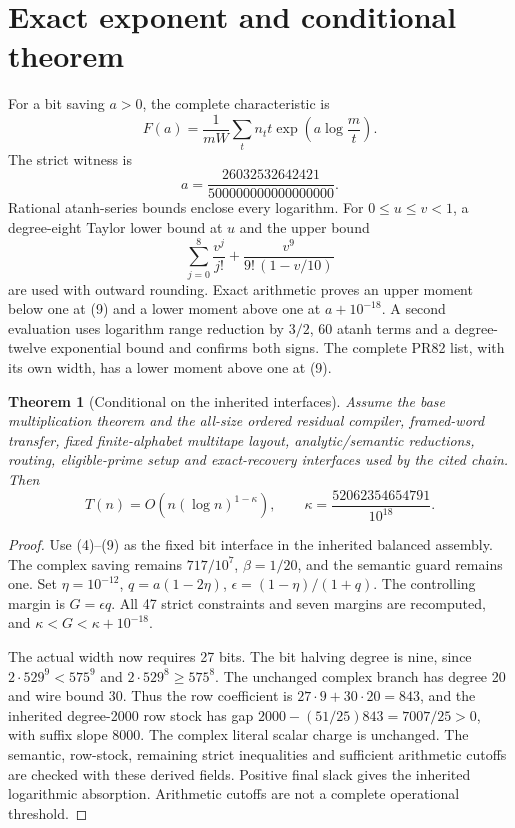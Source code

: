 \documentclass[11pt]{article}
\newtheorem{theorem}{Theorem}
\begin{document}
\section{Exact exponent and conditional theorem}
For a bit saving \(a>0\), the complete characteristic is
\[
 F(a)=\frac1{mW}\sum_t n_t t\exp\!\left(a\log\frac mt\right).
                                                                  \tag{8}
\]
The strict witness is
\[
 a=\frac{26032532642421}{500000000000000000}.                       \tag{9}
\]
Rational atanh-series bounds enclose every logarithm. For
\(0\le u\le v<1\), a degree-eight Taylor lower bound at \(u\) and the
upper bound
\[
 \sum_{j=0}^{8}\frac{v^j}{j!}+\frac{v^9}{9!\,(1-v/10)}            \tag{10}
\]
are used with outward rounding. Exact arithmetic proves an upper moment
below one at (9) and a lower moment above one at \(a+10^{-18}\). A second
evaluation uses logarithm range reduction by \(3/2\), 60 atanh terms and
a degree-twelve exponential bound and confirms both signs. The complete
PR82 list, with its own width, has a lower moment above one at (9).

\begin{theorem}[Conditional on the inherited interfaces]
Assume the base multiplication theorem and the all-size ordered residual
compiler, framed-word transfer, fixed finite-alphabet multitape layout,
analytic/semantic reductions, routing, eligible-prime setup and exact-recovery
interfaces used by the cited chain. Then
\[
 T(n)=O\!\left(n(\log n)^{1-\kappa}\right),\qquad
 \kappa=\frac{52062354654791}{10^{18}}.
\]
\end{theorem}
\begin{proof}
Use (4)--(9) as the fixed bit interface in the inherited balanced assembly.
The complex saving remains \(717/10^7\), \(\beta=1/20\), and the semantic
guard remains one. Set \(\eta=10^{-12}\), \(q=a(1-2\eta)\),
\(\epsilon=(1-\eta)/(1+q)\). The controlling margin is \(G=\epsilon q\).
All 47 strict constraints and seven margins are recomputed, and
\(\kappa<G<\kappa+10^{-18}\).

The actual width now requires 27 bits. The bit halving degree is nine,
since \(2\cdot529^9<575^9\) and \(2\cdot529^8\ge575^8\).
The unchanged complex branch has degree 20 and wire bound 30. Thus the
row coefficient is \(27\cdot9+30\cdot20=843\), and the inherited degree-2000
row stock has gap \(2000-(51/25)843=7007/25>0\), with suffix slope 8000.
The complex literal scalar charge is unchanged. The semantic, row-stock,
remaining strict inequalities and sufficient arithmetic cutoffs are checked
with these derived fields. Positive final slack gives the inherited logarithmic
absorption. Arithmetic cutoffs are not a complete operational threshold.
\end{proof}
\end{document}

